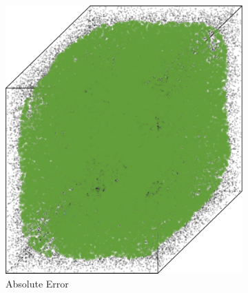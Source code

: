 			\begin{figure}[b!]
				\centering
				\begin{subfigure}{0.23\textwidth}
					\centering
					\includegraphics[keepaspectratio=true, width=\textwidth, height=0.23\textheight]{discussion/img/ferdosi_3_more_noise_abs_error_mbeSmallerThansambe.png}
					\caption{Absolute Error}
					\label{fig:discussion:ferdosi3Noise:mbeLowerError}
				\end{subfigure}
				\begin{subfigure}{0.23\textwidth}
					\centering

\end{subfigure}
\end{figure}
